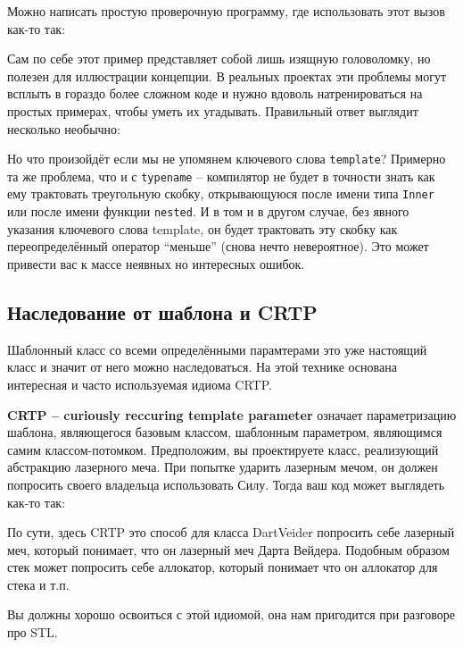 \documentclass[a4paper,12pt,oneside]{article}
\begin{document}
Можно написать простую проверочную программу, где использовать этот вызов как-то так:



Сам по себе этот пример представляет собой лишь изящную головоломку, но полезен для иллюстрации концепции. В реальных проектах эти проблемы могут всплыть в гораздо более сложном коде и нужно вдоволь натренироваться на простых примерах, чтобы уметь их угадывать. Правильный ответ выглядит несколько необычно:



Но что произойдёт если мы не упомянем ключевого слова \lstinline!template!? Примерно та же проблема, что и с \lstinline!typename! -- компилятор не будет в точности знать как ему трактовать треугольную скобку, открывающуюся после имени типа \lstinline!Inner! или после имени функции \lstinline!nested!. И в том и в другом случае, без явного указания ключевого слова template, он будет трактовать эту скобку как переопределённый оператор ``меньше'' (снова нечто невероятное). Это может привести вас к массе неявных но интересных ошибок.

\subsection{Наследование от шаблона и CRTP}

Шаблонный класс со всеми определёнными парамтерами это уже настоящий класс и значит от него можно наследоваться. На этой технике основана интересная и часто используемая идиома CRTP.

\textbf{CRTP – curiously reccuring template parameter} означает параметризацию шаблона, являющегося базовым классом, шаблонным параметром, являющимся самим классом-потомком. Предположим, вы проектируете класс, реализующий абстракцию лазерного меча. При попытке ударить лазерным мечом, он должен попросить своего владельца использовать Силу. Тогда ваш код может выглядеть как-то так:



По сути, здесь CRTP это способ для класса DartVeider попросить себе лазерный меч, который понимает, что он лазерный меч Дарта Вейдера. Подобным образом стек может попросить себе аллокатор, который понимает что он аллокатор для стека и т.п.

Вы должны хорошо освоиться с этой идиомой, она нам пригодится при разговоре про STL.
\end{document}
